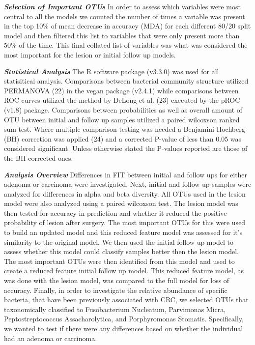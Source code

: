 \documentclass[12pt,]{article}
\begin{document}
\textbf{\emph{Selection of Important OTUs}} In order to assess which
variables were most central to all the models we counted the number of
times a variable was present in the top 10\% of mean decrease in
accuracy (MDA) for each different 80/20 split model and then filtered
this list to variables that were only present more than 50\% of the
time. This final collated list of variables was what was considered the
most important for the lesion or initial follow up models.

\textbf{\emph{Statistical Analysis}} The R software package (v3.3.0) was
used for all statisitical analysis. Comparisons between bacterial
community structure utilized PERMANOVA (22) in the vegan package
(v2.4.1) while comparisons between ROC curves utilized the method by
DeLong et al. (23) executed by the pROC (v1.8) package. Comparisons
between probabilities as well as overall amount of OTU between initial
and follow up samples utilized a paired wilcoxson ranked sum test. Where
multiple comparison testing was needed a Benjamini-Hochberg (BH)
correction was applied (24) and a corrected P-value of less than 0.05
was considered significant. Unless otherwise stated the P-values
reported are those of the BH corrected ones.

\textbf{\emph{Analysis Overview}} Differences in FIT between initial and
follow ups for either adenoma or carcinoma were investigated. Next,
initial and follow up samples were analyzed for differences in alpha and
beta diversity. All OTUs used in the lesion model were also analyzed
using a paired wilcoxson test. The lesion model was then tested for
accuracy in prediction and whether it reduced the positive probability
of lesion after surgery. The most important OTUs for this were used to
build an updated model and this reduced feature model was assessed for
it's similarity to the original model. We then used the initial follow
up model to assess whether this model could classify samples better then
the lesion model. The most important OTUs were then identified from this
model and used to create a reduced feature initial follow up model. This
reduced feature model, as was done with the lesion model, was compared
to the full model for loss of accuracy. Finally, in order to investigate
the relative abundance of specific bacteria, that have been previously
associated with CRC, we selected OTUs that taxonomically classified to
Fusobacterium Nucleatum, Parvimonas Micra, Peptostreptococcus
Assacharolytica, and Porphyromonas Stomatis. Specifically, we wanted to
test if there were any differences based on whether the individual had
an adenoma or carcinoma.
\end{document}
